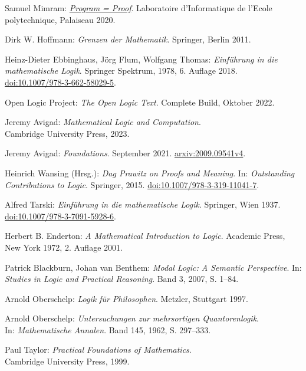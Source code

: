 \begin{thebibliography}{00}
Samuel Mimram:
\emph{\href{https://www.lix.polytechnique.fr/Labo/Samuel.Mimram/publications/}%
{Program = Proof}}.
Laboratoire d'Informatique de l'Ecole polytechnique, Palaiseau 2020.

Dirk W. Hoffmann: \emph{Grenzen der Mathematik}.
Springer, Berlin 2011.

Heinz-Dieter Ebbinghaus, Jörg Flum, Wolfgang Thomas:
\emph{Einführung in die mathematische Logik}.
Springer Spektrum, 1978, 6. Auflage 2018.\\
\href{https://doi.org/10.1007/978-3-662-58029-5}%
{doi:10.1007/978-3-662-58029-5}.

 Open Logic Project:
\emph{The Open Logic Text}. Complete Build, Oktober 2022.

 Jeremy Avigad:
\emph{Mathematical Logic and Computation}.\\
Cambridge University Press, 2023.

 Jeremy Avigad: \emph{Foundations}.
September 2021. \href{https://arxiv.org/abs/2009.09541v4}{arxiv:2009.09541v4}.

 Heinrich Wansing (Hrsg.):
\emph{Dag Prawitz on Proofs and Meaning}.
In: \emph{Outstanding Contributions to Logic}. Springer, 2015.
\href{https://doi.org/10.1007/978-3-319-11041-7}{doi:10.1007/978-3-319-11041-7}.

 Alfred Tarski:
\emph{Einführung in die mathematische Logik}. Springer, Wien 1937.\\
\href{https://doi.org/10.1007/978-3-7091-5928-6}{doi:10.1007/978-3-7091-5928-6}.

 Herbert B. Enderton:
\emph{A Mathematical Introduction to Logic}.
Academic Press, New York 1972, 2. Auflage 2001.

 Patrick Blackburn, Johan van Benthem:
\emph{Modal Logic: A Semantic Perspective}.
In: \emph{Studies in Logic and Practical Reasoning}.
Band 3, 2007, S. 1--84.

 Arnold Oberschelp:
\emph{Logik für Philosophen}. Metzler, Stuttgart 1997.

 Arnold Oberschelp:
\emph{Untersuchungen zur mehrsortigen Quantorenlogik}.\\
In: \emph{Mathematische Annalen}. Band 145, 1962, S. 297--333.

 Paul Taylor:
\emph{Practical Foundations of Mathematics}.\\
Cambridge University Press, 1999.


\end{thebibliography}
